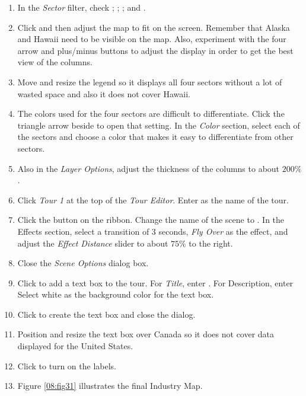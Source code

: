\begin{enumerate}
	\item In the \textit{Sector} filter, check ; ; ; and .
	\item Click  and then adjust the map to fit on the screen. Remember that Alaska and Hawaii need to be visible on the map. Also, experiment with the four arrow and plus/minus buttons to adjust the display in order to get the best view of the columns.
	\item Move and resize the legend so it displays all four sectors without a lot of wasted space and also it does not cover Hawaii.
	\item The colors used for the four sectors are difficult to differentiate. Click the triangle arrow beside  to open that setting. In the \textit{Color} section, select each of the sectors and choose a color that makes it easy to differentiate from other sectors.
	\item Also in the \textit{Layer Options}, adjust the thickness of the columns to about $ 200\% $.
	\item Click \textit{Tour 1} at the top of the \textit{Tour Editor}. Enter  as the name of the tour. 
	\item Click the  button on the ribbon. Change the name of the scene to . In the Effects section, select a transition of $ 3 $ seconds, \textit{Fly Over} as the effect, and adjust the \textit{Effect Distance} slider to about $ 75\% $ to the right.
	\item Close the \textit{Scene Options} dialog box.
	\item Click  to add a text box to the tour. For \textit{Title}, enter . For Description, enter  Select white as the background color for the text box.
	\item Click  to create the text box and close the dialog.
	\item Position and resize the text box over Canada so it does not cover data displayed for the United States.
	\item Click  to turn on the labels.
	\item Figure \ref{08:fig31} illustrates the final Industry Map.
	

\end{enumerate}
